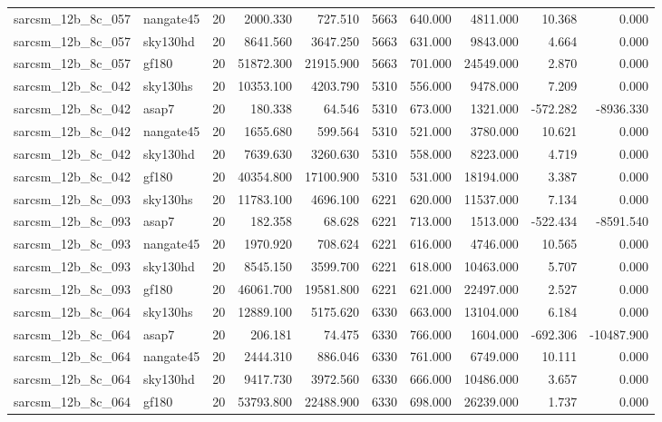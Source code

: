 \begin{tabular}{llrrrrrrrr}
sarcsm\_12b\_8c\_057 & nangate45 & 20 & 2000.330 & 727.510 & 5663 & 640.000 & 4811.000 & 10.368 & 0.000 \\
sarcsm\_12b\_8c\_057 & sky130hd & 20 & 8641.560 & 3647.250 & 5663 & 631.000 & 9843.000 & 4.664 & 0.000 \\
sarcsm\_12b\_8c\_057 & gf180 & 20 & 51872.300 & 21915.900 & 5663 & 701.000 & 24549.000 & 2.870 & 0.000 \\
sarcsm\_12b\_8c\_042 & sky130hs & 20 & 10353.100 & 4203.790 & 5310 & 556.000 & 9478.000 & 7.209 & 0.000 \\
sarcsm\_12b\_8c\_042 & asap7 & 20 & 180.338 & 64.546 & 5310 & 673.000 & 1321.000 & -572.282 & -8936.330 \\
sarcsm\_12b\_8c\_042 & nangate45 & 20 & 1655.680 & 599.564 & 5310 & 521.000 & 3780.000 & 10.621 & 0.000 \\
sarcsm\_12b\_8c\_042 & sky130hd & 20 & 7639.630 & 3260.630 & 5310 & 558.000 & 8223.000 & 4.719 & 0.000 \\
sarcsm\_12b\_8c\_042 & gf180 & 20 & 40354.800 & 17100.900 & 5310 & 531.000 & 18194.000 & 3.387 & 0.000 \\
sarcsm\_12b\_8c\_093 & sky130hs & 20 & 11783.100 & 4696.100 & 6221 & 620.000 & 11537.000 & 7.134 & 0.000 \\
sarcsm\_12b\_8c\_093 & asap7 & 20 & 182.358 & 68.628 & 6221 & 713.000 & 1513.000 & -522.434 & -8591.540 \\
sarcsm\_12b\_8c\_093 & nangate45 & 20 & 1970.920 & 708.624 & 6221 & 616.000 & 4746.000 & 10.565 & 0.000 \\
sarcsm\_12b\_8c\_093 & sky130hd & 20 & 8545.150 & 3599.700 & 6221 & 618.000 & 10463.000 & 5.707 & 0.000 \\
sarcsm\_12b\_8c\_093 & gf180 & 20 & 46061.700 & 19581.800 & 6221 & 621.000 & 22497.000 & 2.527 & 0.000 \\
sarcsm\_12b\_8c\_064 & sky130hs & 20 & 12889.100 & 5175.620 & 6330 & 663.000 & 13104.000 & 6.184 & 0.000 \\
sarcsm\_12b\_8c\_064 & asap7 & 20 & 206.181 & 74.475 & 6330 & 766.000 & 1604.000 & -692.306 & -10487.900 \\
sarcsm\_12b\_8c\_064 & nangate45 & 20 & 2444.310 & 886.046 & 6330 & 761.000 & 6749.000 & 10.111 & 0.000 \\
sarcsm\_12b\_8c\_064 & sky130hd & 20 & 9417.730 & 3972.560 & 6330 & 666.000 & 10486.000 & 3.657 & 0.000 \\
sarcsm\_12b\_8c\_064 & gf180 & 20 & 53793.800 & 22488.900 & 6330 & 698.000 & 26239.000 & 1.737 & 0.000 \\

\end{tabular}
